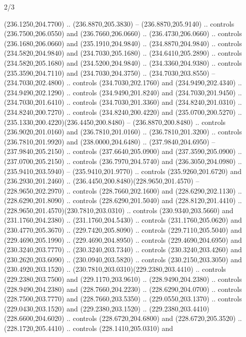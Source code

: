 \begin{flagdescription}{2/3}
\begin{scope}[xshift=0.5\flaglength,yshift=0.5\flagwidth,scale=\flagwidth/259.2]
\begin{scope}[y=0.8pt, x=0.8pt, yscale=-1,shift={(-243,-162)}]
      (236.1250,204.7700) .. (236.8870,205.3830) -- (236.8870,205.9140) .. controls
      (236.7500,206.0550) and (236.7660,206.0660) .. (236.4730,206.0660) .. controls
      (236.1680,206.0660) and (235.1910,204.9840) .. (234.8870,204.9840) .. controls
      (234.5820,204.9840) and (234.7030,205.1680) .. (234.6410,205.2890) .. controls
      (234.5820,205.1680) and (234.5200,204.9840) .. (234.3360,204.9380) .. controls
      (235.3590,204.7110) and (234.7030,204.3750) .. (234.7030,203.8550) --
      (234.7030,202.4800) .. controls (234.7030,202.1760) and (234.9490,202.4340) ..
      (234.9490,202.1290) .. controls (234.9490,201.8240) and (234.7030,201.9450) ..
      (234.7030,201.6410) .. controls (234.7030,201.3360) and (234.8240,201.0310) ..
      (234.8240,200.7270) .. controls (234.8240,200.4220) and (235.0700,200.5270) ..
      (235.1330,200.4220)(236.4450,200.8480) -- (236.8870,200.8480) .. controls
      (236.9020,201.0160) and (236.7810,201.0160) .. (236.7810,201.3200) .. controls
      (236.7810,201.9920) and (238.0000,204.6480) .. (237.9840,204.6950) --
      (237.9840,205.2150) .. controls (237.6640,205.0900) and (237.3590,205.0900) ..
      (237.0700,205.2150) .. controls (236.7970,204.5740) and (236.3050,204.0980) ..
      (235.9410,203.5940) -- (235.9410,201.9770) .. controls (235.9260,201.6720) and
      (236.2930,201.2460) .. (236.4450,200.8480)(228.9650,201.4570) --
      (228.9650,202.2970) .. controls (228.7660,202.1600) and (228.6290,202.1130) ..
      (228.6290,201.8090) .. controls (228.6290,201.5040) and (228.8120,201.4410) ..
      (228.9650,201.4570)(230.7810,203.0310) .. controls (230.9340,203.5660) and
      (231.1760,204.2380) .. (231.1760,204.5430) .. controls (231.1760,205.0620) and
      (230.4770,205.3670) .. (229.7420,205.8090) .. controls (229.7110,205.5040) and
      (229.4690,205.1990) .. (229.4690,204.8950) .. controls (229.4690,204.6950) and
      (230.3240,203.7770) .. (230.3240,203.7340) .. controls (230.3240,203.4260) and
      (230.2620,203.6090) .. (230.0940,203.5820) .. controls (230.2150,203.3050) and
      (230.4920,203.1520) .. (230.7810,203.0310)(229.2380,203.4410) .. controls
      (229.2380,203.7500) and (229.1170,203.9610) .. (228.9490,204.2380) .. controls
      (228.9490,204.2380) and (228.7660,204.2230) .. (228.6290,204.0700) .. controls
      (228.7500,203.7770) and (228.7660,203.5350) .. (229.0550,203.1370) .. controls
      (229.0430,203.1520) and (229.2380,203.1520) ..
      (229.2380,203.4410)(228.6600,204.6020) .. controls (228.6720,204.6800) and
      (228.6720,205.3520) .. (228.1720,205.4410) .. controls (228.1410,205.0310) and

\end{scope}
\end{scope}
\end{flagdescription}
